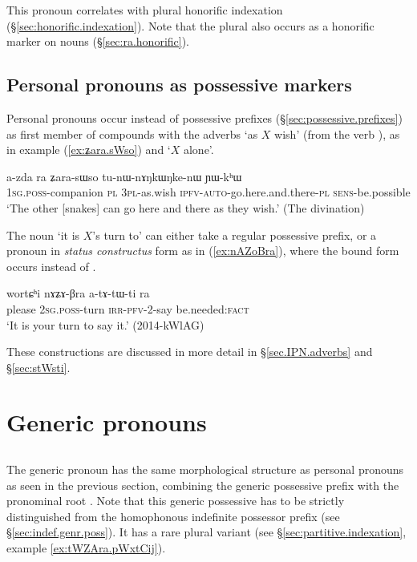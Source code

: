 This pronoun correlates with plural honorific indexation  (§\ref{sec:honorific.indexation}). Note that the plural  also occurs as a honorific marker on nouns (§\ref{sec:ra.honorific}).

\subsection{Personal pronouns as possessive markers} \label{sec:pronouns.possessive.markers}
Personal pronouns occur instead of possessive prefixes (§\ref{sec:possessive.prefixes}) as first member of compounds  with the adverbs  `as $X$ wish' (from the verb ), as in example (\ref{ex:ʑara.sWso}) and  `$X$ alone'.  

\begin{exe}
\ex \label{ex:ʑara.sWso}
\gll a-zda ra ʑara-sɯso tu-nɯ-nɤŋkɯŋke-nɯ ɲɯ-kʰɯ \\
\textsc{1sg}.\textsc{poss}-companion \textsc{pl} \textsc{3pl}-as.wish \textsc{ipfv}-\textsc{auto}-go.here.and.there-\textsc{pl} \textsc{sens}-be.possible \\
\glt `The other [snakes] can go here and there as they wish.' (The divination)
\end{exe}

The noun  `it is $X$'s turn to' can either take a regular possessive prefix, or a pronoun in \textit{status constructus} form as in (\ref{ex:nAZoBra}), where the bound form  occurs instead of .
\begin{exe}
\ex \label{ex:nAZoBra}
\gll  wortɕʰi nɤʑɤ-βra a-tɤ-tɯ-ti ra \\
please \textsc{2sg}.\textsc{poss}-turn \textsc{irr}-\textsc{pfv}-2-say be.needed:\textsc{fact} \\
\glt `It is your turn to say it.' (2014-kWlAG)
\end{exe}


These constructions are discussed in more detail in §\ref{sec.IPN.adverbs} and §\ref{sec:stWsti}.

\section{Generic pronouns}  

\subsection{}  \label{sec:genr.pro}
The generic pronoun  has the same morphological structure as personal pronouns as seen in the previous section, combining the generic possessive prefix  with the pronominal root . Note that this generic possessive has to be strictly distinguished from the homophonous indefinite possessor prefix  (see §\ref{sec:indef.genr.poss}). It has a rare plural variant  (see  §\ref{sec:partitive.indexation}, example \ref{ex:tWZAra.pWxtCij}).

